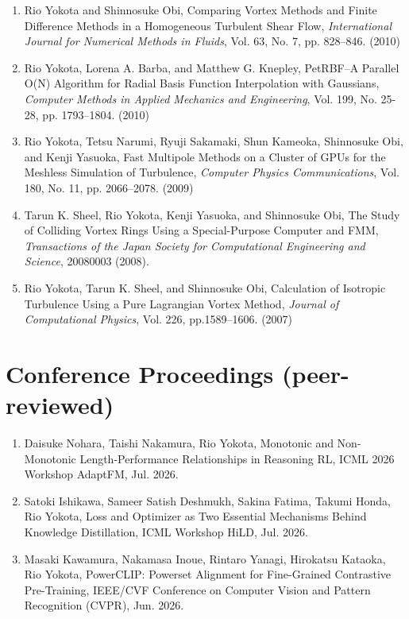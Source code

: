 \documentclass[margin,line]{cv}
\begin{document}
\begin{resume}
\begin{enumerate}
\item Rio Yokota and Shinnosuke Obi, Comparing Vortex Methods and Finite Difference Methods in a Homogeneous Turbulent Shear Flow, {\it International Journal for Numerical Methods in Fluids}, Vol. 63, No. 7, pp. 828--846. (2010)

\item Rio Yokota, Lorena A. Barba, and Matthew G. Knepley, PetRBF--A Parallel O(N) Algorithm for Radial Basis Function Interpolation with Gaussians, {\it Computer Methods in Applied Mechanics and Engineering}, Vol. 199, No. 25-28, pp. 1793--1804. (2010)

\item Rio Yokota, Tetsu Narumi, Ryuji Sakamaki, Shun Kameoka, Shinnosuke Obi, and Kenji Yasuoka, Fast Multipole Methods on a Cluster of GPUs for the Meshless Simulation of Turbulence, {\it Computer Physics Communications}, Vol. 180, No. 11, pp. 2066--2078. (2009)

\item Tarun K. Sheel, Rio Yokota, Kenji Yasuoka, and Shinnosuke Obi, The Study of Colliding Vortex Rings Using a Special-Purpose Computer and FMM, {\it Transactions of the Japan Society for Computational Engineering and Science}, 20080003 (2008).

\item Rio Yokota, Tarun K. Sheel, and Shinnosuke Obi, Calculation of Isotropic Turbulence Using a Pure Lagrangian Vortex Method, {\it Journal of Computational Physics}, Vol. 226, pp.1589--1606. (2007)
\end{enumerate}

\section{\sc Conference Proceedings (peer-reviewed)}
\begin{enumerate}
\item Daisuke Nohara, Taishi Nakamura, Rio Yokota, Monotonic and Non-Monotonic Length-Performance Relationships in Reasoning RL, ICML 2026 Workshop AdaptFM, Jul. 2026.

\item Satoki Ishikawa, Sameer Satish Deshmukh, Sakina Fatima, Takumi Honda, Rio Yokota, Loss and Optimizer as Two Essential Mechanisms Behind Knowledge Distillation, ICML Workshop HiLD, Jul. 2026.

\item Masaki Kawamura, Nakamasa Inoue, Rintaro Yanagi, Hirokatsu Kataoka, Rio Yokota, PowerCLIP: Powerset Alignment for Fine-Grained Contrastive Pre-Training, IEEE/CVF Conference on Computer Vision and Pattern Recognition (CVPR), Jun. 2026.


\end{enumerate}
\end{resume}
\end{document}
